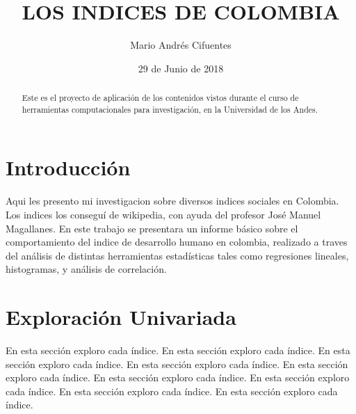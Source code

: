 \documentclass{article}
\title{LOS INDICES DE COLOMBIA}
\author[1]{\normalsize Mario Andrés Cifuentes}
\affil[1,2]{\small  Departamento Ingeniería Industrial,Universidad de los Andes\\
\texttt{{ma.cifuentes10}@uniandes.edu.co}}
\date{29 de Junio de 2018}
\begin{document}


\maketitle


\begin{abstract}
Este es el proyecto de aplicación de los contenidos vistos durante el curso de herramientas computacionales para investigación, en la Universidad de los Andes.
\end{abstract}

\section*{Introducción}

Aqui les presento mi investigacion sobre diversos indices sociales en Colombia. Los indices los conseguí de wikipedia, con ayuda del profesor José Manuel Magallanes. En este trabajo se presentara un informe básico sobre el comportamiento del indice de desarrollo humano en colombia, realizado a traves del análisis de distintas herramientas estadísticas tales como regresiones lineales, histogramas, y análisis de correlación. 

\clearpage

\section{Exploración Univariada}\label{univariada}

En esta sección exploro cada índice. En esta sección exploro cada índice. En esta sección exploro cada índice. En esta sección exploro cada índice. En esta sección exploro cada índice. En esta sección exploro cada índice. En esta sección exploro cada índice. En esta sección exploro cada índice. En esta sección exploro cada índice.
\end{document}
